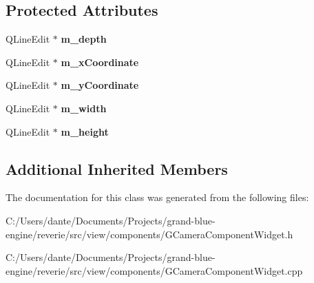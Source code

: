 \subsection*{Protected Attributes}
\begin{DoxyCompactItemize}
\item 
\mbox{\label{classrev_1_1_view_1_1_camera_viewport_widget_abf082d962664266b37e4b6ca4561ae9e}} 
Q\+Line\+Edit $\ast$ {\bfseries m\+\_\+depth}
\item 
\mbox{\label{classrev_1_1_view_1_1_camera_viewport_widget_ae929309f52f910f6d888c33c495905f4}} 
Q\+Line\+Edit $\ast$ {\bfseries m\+\_\+x\+Coordinate}
\item 
\mbox{\label{classrev_1_1_view_1_1_camera_viewport_widget_a18d7da2e005b1d27c1ec19af60ec62aa}} 
Q\+Line\+Edit $\ast$ {\bfseries m\+\_\+y\+Coordinate}
\item 
\mbox{\label{classrev_1_1_view_1_1_camera_viewport_widget_a8748be41c1a676f858014741a61d853e}} 
Q\+Line\+Edit $\ast$ {\bfseries m\+\_\+width}
\item 
\mbox{\label{classrev_1_1_view_1_1_camera_viewport_widget_a3824fc153c920f951dba0002404b8d23}} 
Q\+Line\+Edit $\ast$ {\bfseries m\+\_\+height}
\end{DoxyCompactItemize}
\subsection*{Additional Inherited Members}


The documentation for this class was generated from the following files\+:\begin{DoxyCompactItemize}
\item 
C\+:/\+Users/dante/\+Documents/\+Projects/grand-\/blue-\/engine/reverie/src/view/components/G\+Camera\+Component\+Widget.\+h\item 
C\+:/\+Users/dante/\+Documents/\+Projects/grand-\/blue-\/engine/reverie/src/view/components/G\+Camera\+Component\+Widget.\+cpp\end{DoxyCompactItemize}
